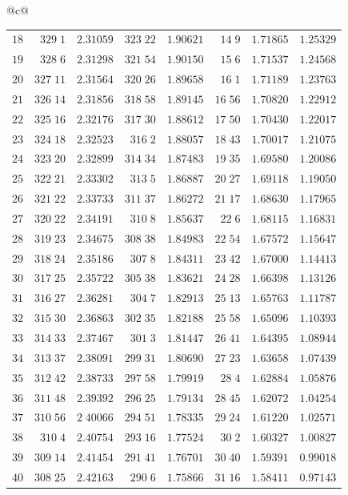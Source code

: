 \begin{center}
{\begin{tabular}{@{}c@{}}
\begin{tabular}{r|r|r|r|r|r|r|r}
$18$&$329\;1$&$2.31059$&$323\;22$&$1.90621$&$14\;9$&$1.71865$&$1.25329$\\
$19$&$328\;6$&$2.31298$&$321\;54$&$1.90150$&$15\;6$&$1.71537$&$1.24568$\\[2pt]
$20$&$327\;11$&$2.31564$&$320\;26$&$1.89658$&$16\;1$&$1.71189$&$1.23763$\\
$21$&$326\;14$&$2.31856$&$318\;58$&$1.89145$&$16\;56$&$1.70820$&$1.22912$\\
$22$&$325\;16$&$2.32176$&$317\;30$&$1.88612$&$17\;50$&$1.70430$&$1.22017$\\
$23$&$324\;18$&$2.32523$&$316\;2$&$1.88057$&$18\;43$&$1.70017$&$1.21075$\\
$24$&$323\;20$&$2.32899$&$314\;34$&$1.87483$&$19\;35$&$1.69580$&$1.20086$\\[2pt]
$25$&$322\;21$&$2.33302$&$313\;5$&$1.86887$&$20\;27$&$1.69118$&$1.19050$\\
$26$&$321\;22$&$2.33733$&$311\;37$&$1.86272$&$21\;17$&$1.68630$&$1.17965$\\
$27$&$320\;22$&$2.34191$&$310\;8$&$1.85637$&$22\;6$&$1.68115$&$1.16831$\\
$28$&$319\;23$&$2.34675$&$308\;38$&$1.84983$&$22\;54$&$1.67572$&$1.15647$\\
$29$&$318\;24$&$2.35186$&$307\;8$&$1.84311$&$23\;42$&$1.67000$&$1.14413$\\[2pt]
$30$&$317\;25$&$2.35722$&$305\;38$&$1.83621$&$24\;28$&$1.66398$&$1.13126$\\
$31$&$316\;27$&$2.36281$&$304\;7$&$1.82913$&$25\;13$&$1.65763$&$1.11787$\\
$32$&$315\;30$&$2.36863$&$302\;35$&$1.82188$&$25\;58$&$1.65096$&$1.10393$\\
$33$&$314\;33$&$2.37467$&$301\;3$&$1.81447$&$26\;41$&$1.64395$&$1.08944$\\
$34$&$313\;37$&$2.38091$&$299\;31$&$1.80690$&$27\;23$&$1.63658$&$1.07439$\\[2pt]
$35$&$312\;42$&$2.38733$&$297\;58$&$1.79919$&$28\;4$&$1.62884$&$1.05876$\\
$36$&$311\;48$&$2.39392$&$296\;25$&$1.79134$&$28\;45$&$1.62072$&$1.04254$\\
$37$&$310\;56$&$2\;40066$&$294\;51$&$1.78335$&$29\;24$&$1.61220$&$1.02571$\\
$38$&$310\;4$&$2.40754$&$293\;16$&$1.77524$&$30\;2$&$1.60327$&$1.00827$\\
$39$&$309\;14$&$2.41454$&$291\;41$&$1.76701$&$30\;40$&$1.59391$&$0.99018$\\[2pt]
$40$&$308\;25$&$2.42163$&$290\;6$&$1.75866$&$31\;16$&$1.58411$&$0.97143$\\

\end{tabular}
\end{tabular}}
\end{center}
